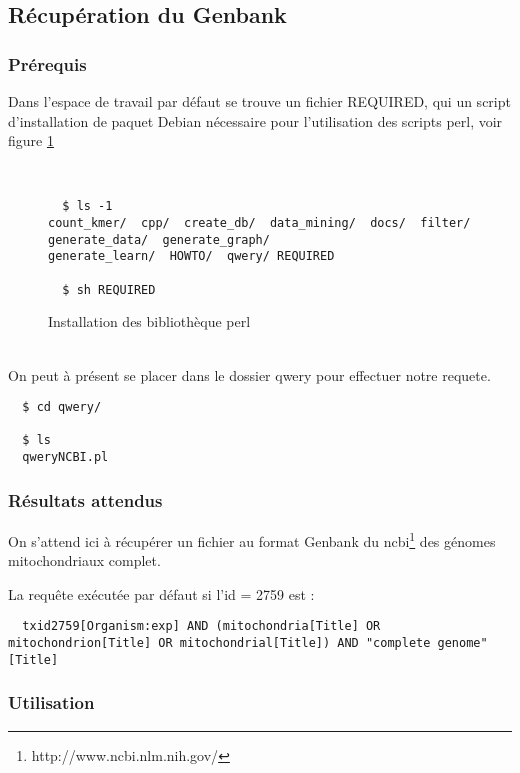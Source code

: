 \subsection{Récupération du Genbank}
\label{qwery}
\subsubsection{Prérequis}

Dans l'espace de travail par défaut se trouve un fichier REQUIRED, qui un
script d'installation de paquet Debian nécessaire  pour l'utilisation des scripts perl, voir figure \ref{installPerl}

~\\
\begin{figure}[H]

\begin{center}
\begin{verbatim}
  $ ls -1
count_kmer/  cpp/  create_db/  data_mining/  docs/  filter/ generate_data/  generate_graph/  
generate_learn/  HOWTO/  qwery/ REQUIRED

  $ sh REQUIRED
\end{verbatim}


\end{center}
\caption{\label{installPerl}Installation des bibliothèque perl}
\end{figure}
~\\

On peut à présent se placer dans le dossier qwery pour effectuer notre requete.

\begin{verbatim}
  $ cd qwery/
  
  $ ls
  qweryNCBI.pl
\end{verbatim}

\subsubsection{Résultats attendus}

On s'attend ici à récupérer un fichier au format Genbank du ncbi\footnote{http://www.ncbi.nlm.nih.gov/} des génomes
mitochondriaux complet.

La requête exécutée par défaut si l'id = 2759 est : 
\begin{verbatim}
  txid2759[Organism:exp] AND (mitochondria[Title] OR mitochondrion[Title] OR mitochondrial[Title]) AND "complete genome"[Title]
\end{verbatim}

\subsubsection{Utilisation}
